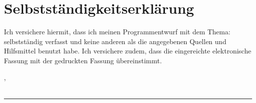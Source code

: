 \thispagestyle{empty}

\section*{Selbstständigkeitserklärung}
\vspace*{2em}


Ich versichere hiermit, dass ich meinen Programmentwurf mit dem Thema: {\itshape \myTitel } selbstständig verfasst und keine anderen als die angegebenen Quellen und Hilfsmittel benutzt habe. Ich versichere zudem, dass die eingereichte elektronische Fassung mit der gedruckten Fassung übereinstimmt.


\vspace{3em}
\noindent
\myAbgabeort, \myDatum
\\
\\
\noindent
\rule{6cm}{0.4pt}\\
\myAutor
